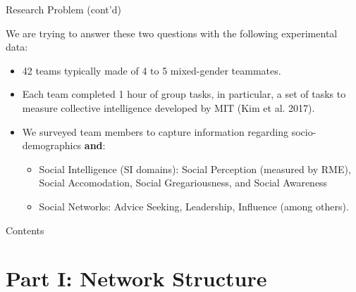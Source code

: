 \documentclass[10pt,ignorenonframetext,aspectratio=169,]{beamer}
\begin{document}
\begin{frame}{Research Problem (cont'd)}
\protect\hypertarget{research-problem-contd}{}

We are trying to answer these two questions with the following
experimental data: \pause

\begin{itemize}
\item
  42 teams typically made of 4 to 5 mixed-gender teammates.\pause
\item
  Each team completed 1 hour of group tasks, in particular, a set of
  tasks to measure collective intelligence developed by MIT (Kim et al.
  2017).\pause
\item
  We surveyed team members to capture information regarding
  socio-demographics \textbf{and}:\pause

  \begin{itemize}
  \item
    Social Intelligence (SI domains): Social Perception (measured by
    RME), Social Accomodation, Social Gregariousness, and Social
    Awareness\pause 
  \item
    Social Networks: Advice Seeking, Leadership, Influence (among
    others).
  \end{itemize}
\end{itemize}

\end{frame}

\begin{frame}{Contents}
\protect\hypertarget{contents}{}

\tableofcontents

\end{frame}

\hypertarget{part-i-network-structure}{%
\section{Part I: Network Structure}\label{part-i-network-structure}}
\end{document}
